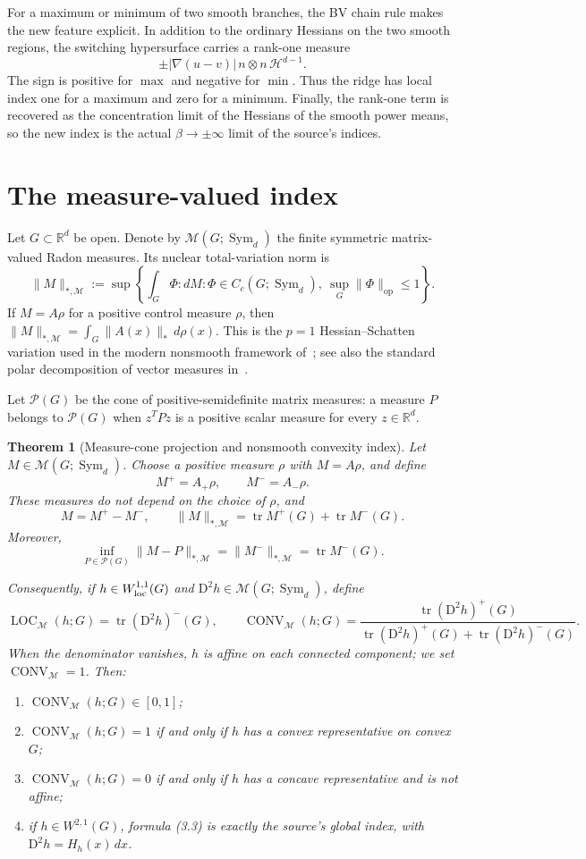 \documentclass[11pt]{article}
\newtheorem{theorem}{Theorem}[section]
\newcommand{\Sym}{\operatorname{Sym}}
\newcommand{\tr}{\operatorname{tr}}
\newcommand{\Pos}{\mathcal P}
\newcommand{\M}{\mathcal M}
\newcommand{\Hess}{\mathrm D^2}
\newcommand{\Conv}{\operatorname{CONV}}
\newcommand{\Loc}{\operatorname{LOC}}
\begin{document}
For a maximum or minimum of two smooth branches, the BV chain rule makes the
new feature explicit.  In addition to the ordinary Hessians on the two smooth
regions, the switching hypersurface carries a rank-one measure
\[
 \pm |\nabla(u-v)|\,n\otimes n\,\mathcal H^{d-1}.
\]
The sign is positive for \(\max\) and negative for \(\min\).  Thus the ridge
has local index one for a maximum and zero for a minimum.  Finally, the
rank-one term is recovered as the concentration limit of the Hessians of the
smooth power means, so the new index is the actual \(\beta\to\pm\infty\)
limit of the source's indices.

\section{The measure-valued index}

Let \(G\subset\mathbb R^d\) be open.  Denote by
\(\M(G;\Sym_d)\) the finite symmetric matrix-valued Radon measures.  Its
nuclear total-variation norm is
\[
 \|M\|_{*,\M}
 :=\sup\left\{\int_G \Phi:dM:
 \Phi\in C_c(G;\Sym_d),\ \sup_G\|\Phi\|_{\mathrm{op}}\le1\right\}.
\]
If \(M=A\rho\) for a positive control measure \(\rho\), then
\(\|M\|_{*,\M}=\int_G\|A(x)\|_*\,d\rho(x)\).  This is the \(p=1\)
Hessian--Schatten variation used in the modern nonsmooth framework
of~\cite{ACU}; see also the standard polar decomposition of vector measures
in~\cite{AFP}.

Let \(\Pos(G)\) be the cone of positive-semidefinite matrix measures: a
measure \(P\) belongs to \(\Pos(G)\) when \(z^TPz\) is a positive scalar
measure for every \(z\in\mathbb R^d\).

\begin{theorem}[Measure-cone projection and nonsmooth convexity index]
\label{thm:measure}
Let \(M\in\M(G;\Sym_d)\).  Choose a positive measure \(\rho\) with
\(M=A\rho\), and define
\[
 M^+=A_+\rho,\qquad M^-=A_-\rho.
\]
These measures do not depend on the choice of \(\rho\), and
\[
 M=M^+-M^-,\qquad
 \|M\|_{*,\M}=\tr M^+(G)+\tr M^-(G).                 \tag{3.1}
\]
Moreover,
\[
 \boxed{\quad
 \inf_{P\in\Pos(G)}\|M-P\|_{*,\M}
   =\|M^-\|_{*,\M}=\tr M^-(G).
 \quad}                                               \tag{3.2}
\]

Consequently, if \(h\in W^{1,1}_{\rm loc}(G)\) and
\(\Hess h\in\M(G;\Sym_d)\), define
\[
 \Loc_{\M}(h;G)=\tr(\Hess h)^-(G),\qquad
 \Conv_{\M}(h;G)=
 \frac{\tr(\Hess h)^+(G)}
 {\tr(\Hess h)^+(G)+\tr(\Hess h)^-(G)}.             \tag{3.3}
\]
When the denominator vanishes, \(h\) is affine on each connected component;
we set \(\Conv_{\M}=1\).  Then:
\begin{enumerate}
\item \(\Conv_{\M}(h;G)\in[0,1]\);
\item \(\Conv_{\M}(h;G)=1\) if and only if \(h\) has a convex
representative on convex \(G\);
\item \(\Conv_{\M}(h;G)=0\) if and only if \(h\) has a concave
representative and is not affine;
\item if \(h\in W^{2,1}(G)\), formula (3.3) is exactly the source's global
index, with \(\Hess h=H_h(x)\,dx\).
\end{enumerate}
\end{theorem}
\end{document}
